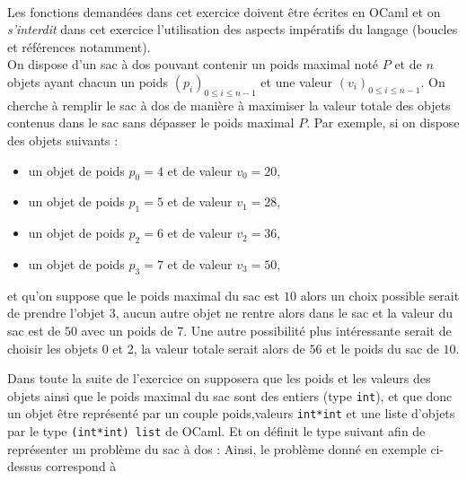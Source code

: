 \documentclass[11pt,a4paper]{article}
\begin{document}
\begin{Exercise}[title = {Implémentation d'un tableau associatif}, origin = {\bac \; {\sc ccmp 2025}, {\sc mpi} } ]
\end{Exercise}


\begin{Exercise}[title={Problème du sac à dos}]\\
Les fonctions demandées dans cet exercice doivent être écrites en OCaml et on \textit{s'interdit} dans cet exercice l'utilisation des aspects impératifs du langage (boucles et références notamment).\\
On dispose d'un sac à dos pouvant contenir un poids maximal noté $P$ et de $n$ objets ayant chacun un poids $\left(p_i\right)_{0\leqslant i \leqslant n-1}$ et une valeur $\left(v_i\right)_{0\leqslant i \leqslant n-1}$. On cherche à remplir le sac à dos de manière à maximiser la valeur totale des objets contenus dans le sac sans dépasser le poids maximal $P$.
Par exemple, si on dispose des objets suivants :
\begin{itemize}
	\item un objet de poids $p_0 = 4$ et de valeur $v_0 = 20$,
	\item un objet de poids $p_1 = 5$ et de valeur $v_1 = 28$,
	\item un objet de poids $p_2 = 6$ et de valeur $v_2 = 36$,
	\item un objet de poids $p_3 = 7$ et de valeur $v_3 = 50$,
\end{itemize}
et qu'on suppose que le poids maximal du sac est $10$ alors un choix possible serait de prendre l'objet 3, aucun autre objet ne rentre alors dans le sac et la valeur du sac est  de $50$ avec un poids de 7. Une autre possibilité plus intéressante serait de choisir les objets 0  et 2, la valeur totale serait alors de $56$ et le poids du sac de $10$.\smallskip

Dans toute la suite de l'exercice on supposera que les poids et les valeurs des objets ainsi que le poids maximal du sac sont des entiers (type {\tt int}), et que donc un objet  être représenté par un couple poids,valeurs {\tt int*int} et une liste d'objets par le type {\tt (int*int) list} de OCaml. Et on définit le type suivant afin de représenter un problème du sac à dos :
Ainsi, le problème donné en exemple ci-dessus correspond à



\end{Exercise}
\end{document}
